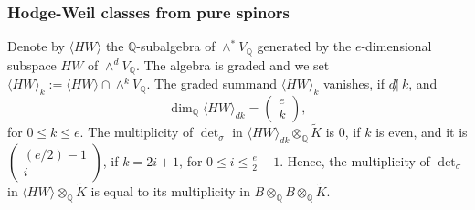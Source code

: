 \documentclass[12pt]{amsart}
\newcommand{\hide}[1]{}
\numberwithin{equation}{subsection}
\theoremstyle{plain}
\newtheorem{lem}[thm]{Lemma}
\theoremstyle{definition}
\newcommand{\QQ}{{\mathbb Q}}
\renewcommand{\P}{{\mathcal P}}
\newcommand{\Spin}{{\rm Spin}}
\newcommand{\Choose}[2]
{\left(\!\!\begin{array}{c}#1\\#2\end{array}\!\!\right)}
\begin{document}
{\subsubsection{Hodge-Weil classes from pure spinors} 
Denote by $\langle HW\rangle$ the $\QQ$-subalgebra of $\wedge^*V_\QQ$ generated by the $e$-dimensional subspace $HW$ of $\wedge^dV_\QQ$. 
The algebra is graded and we set $\langle HW\rangle_k:=\langle HW\rangle\cap \wedge^kV_\QQ.$ The graded summand $\langle HW\rangle_k$ vanishes, if $d\not| \ k$, and
\[
\dim_\QQ \langle HW\rangle_{dk}=\Choose{e}{k},
\]
for $0\leq k\leq e$.
The multiplicity of $\det_\sigma$ in $\langle HW\rangle_{dk}\otimes_\QQ\tilde{K}$ is $0$, if $k$ is even, and it is $\Choose{(e/2)-1}{i}$, if $k=2i+1$, for $0\leq i\leq \frac{e}{2}-1$. Hence, the multiplicity of $\det_\sigma$ in $\langle HW\rangle\otimes_\QQ\tilde{K}$ is equal to its multiplicity in $B\otimes_\QQ B\otimes_\QQ\tilde{K}$. 

\hide{
\begin{lem}
The isomorphism
\[
\tilde{\phi}:=\exp\left(\frac{1}{2}c_1(\P)\right)\cup \phi\circ (id\otimes \tau):H^*(X\times X,\QQ)\rightarrow H^*(X\times\hat{X},\QQ),
\]
which is  $\Spin(V)$-equivariant with respect to $(m\otimes m^\dagger,\rho)$ 
by Proposition \ref{prop-extension-class-of-decreasing-filtration-of-spin-V-representations}, 
satisfies
\begin{equation}
\label{equality-in-degree-de-over-2}
\tilde{\phi}(BB_{e/2})\subset \langle HW\rangle_{de/2},
\end{equation}
where the right hand side is the graded summand of $\langle HW\rangle$ in degree $de/2$. 
\end{lem}

\begin{proof}
The isomorphism $\tilde{\phi}$ extends to a $\Spin(V_{\tilde{K}})_\eta$-equivariant one from $S_\QQ\otimes_\QQ S_\QQ\otimes\tilde{K}$ onto
$\wedge^*V_{\tilde{K}}$. The subspace $BB_{e/2}\otimes_\QQ\tilde{K}$ is the sum of all 
characters of $\Spin(V_{\tilde{K}})_\eta$ isomorphic to $\ell_T\otimes\ell_T$, for some $T\in\hat{\Sigma}$.
The subspace $\langle HW\rangle_{de/2}\otimes_\QQ\tilde{K}$ of $\wedge^*V_{\tilde{K}}$ is the sum of all characters of $\Spin(V_{\tilde{K}})_\eta$ isomorphic to
tensor products $\otimes_{\sigma\in \Sigma'}\det_\sigma$, for some subset $\Sigma'\subset\Sigma$ of cardinality $e/2$, which projects onto (??? no ???) $\hat{\Sigma}$ under the restriction map $\Sigma\rightarrow\hat{\Sigma}$. The two sets of characters are equal, 
by Lemma \ref{lemma-tensor-product-of-two-ells}.
\end{proof}
}

}
\end{document}
